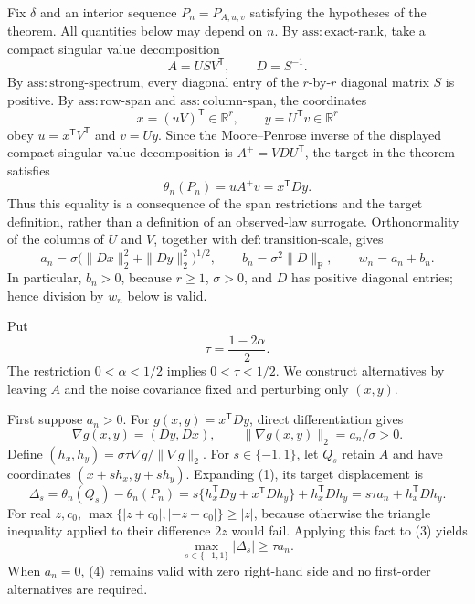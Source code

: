 Fix \(\delta\) and an interior sequence \(P_n=P_{A,u,v}\) satisfying the hypotheses of the theorem.  All quantities below may depend on \(n\).  By \(\mathrm{ass{:}exact\mbox{-}rank}\), take a compact singular value decomposition
\[
A=USV^{\mathsf T},
\qquad
D=S^{-1}.
\]
By \(\mathrm{ass{:}strong\mbox{-}spectrum}\), every diagonal entry of the \(r\)-by-\(r\) diagonal matrix \(S\) is positive.  By \(\mathrm{ass{:}row\mbox{-}span}\) and \(\mathrm{ass{:}column\mbox{-}span}\), the coordinates
\[
x=(uV)^{\mathsf T}\in\mathbb R^r,
\qquad
y=U^{\mathsf T}v\in\mathbb R^r
\]
obey \(u=x^{\mathsf T}V^{\mathsf T}\) and \(v=Uy\).  Since the Moore--Penrose inverse of the displayed compact singular value decomposition is \(A^+=V D U^{\mathsf T}\), the target in the theorem satisfies
\[
\theta_n(P_n)=uA^+v=x^{\mathsf T}Dy. \tag{1}
\]
Thus this equality is a consequence of the span restrictions and the target definition, rather than a definition of an observed-law surrogate.  Orthonormality of the columns of \(U\) and \(V\), together with \(\mathrm{def{:}transition\mbox{-}scale}\), gives
\[
a_n=\sigma\bigl(\|Dx\|_2^2+\|Dy\|_2^2\bigr)^{1/2},
\qquad
b_n=\sigma^2\|D\|_{\mathrm F},
\qquad
w_n=a_n+b_n. \tag{2}
\]
In particular, \(b_n>0\), because \(r\geq1\), \(\sigma>0\), and \(D\) has positive diagonal entries; hence division by \(w_n\) below is valid.

Put
\[
\tau=\frac{1-2\alpha}{2}.
\]
The restriction \(0<\alpha<1/2\) implies \(0<\tau<1/2\).  We construct alternatives by leaving \(A\) and the noise covariance fixed and perturbing only \((x,y)\).

First suppose \(a_n>0\).  For \(g(x,y)=x^{\mathsf T}Dy\), direct differentiation gives
\[
\nabla g(x,y)=(Dy,Dx),
\qquad
\|\nabla g(x,y)\|_2=a_n/\sigma>0.
\]
Define \((h_x,h_y)=\sigma\tau\nabla g/\|\nabla g\|_2\).  For \(s\in\{-1,1\}\), let \(Q_s\) retain \(A\) and have coordinates \((x+s h_x,y+s h_y)\).  Expanding (1), its target displacement is
\[
\Delta_s
=\theta_n(Q_s)-\theta_n(P_n)
=s\{h_x^{\mathsf T}Dy+x^{\mathsf T}Dh_y\}+h_x^{\mathsf T}Dh_y
=s\tau a_n+h_x^{\mathsf T}Dh_y. \tag{3}
\]
For real \(z,c_0\), \(\max\{|z+c_0|,|-z+c_0|\}\geq |z|\), because otherwise the triangle inequality applied to their difference \(2z\) would fail.  Applying this fact to (3) yields
\[
\max_{s\in\{-1,1\}}|\Delta_s|\geq\tau a_n. \tag{4}
\]
When \(a_n=0\), (4) remains valid with zero right-hand side and no first-order alternatives are required.

